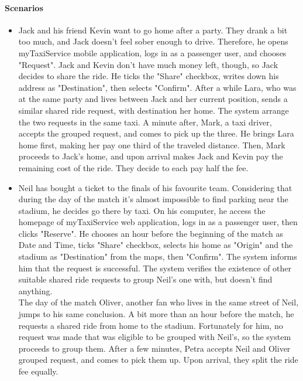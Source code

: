 	\paragraph{Scenarios}
		\begin{itemize}
			\item Jack and his friend Kevin want to go home after a party. They drank a bit too much, and Jack doesn't feel sober enough to drive. Therefore, he opens myTaxiService mobile application, logs in as a passenger user, and chooses "Request". Jack and Kevin don't have much money left, though, so Jack decides to share the ride. He ticks the "Share" checkbox, writes down his address as "Destination", then selects "Confirm". After a while Lara, who was at the same party and lives between Jack and her current position, sends a similar shared ride request, with destination her home. The system arrange the two requests in the same taxi. A minute after, Mark, a taxi driver, accepts the grouped request, and comes to pick up the three. He brings Lara home first, making her pay one third of the traveled distance. Then, Mark proceeds to Jack's home, and upon arrival makes Jack and Kevin pay the remaining cost of the ride. They decide to each pay half the fee.
			
			\item Neil has bought a ticket to the finals of his favourite team. Considering that during the day of the match it's almost impossible to find parking near the stadium, he decides go there by taxi. On his computer, he access the homepage of myTaxiService web application, logs in as a passenger user, then clicks "Reserve". He chooses an hour before the beginning of the match as Date and Time, ticks "Share" checkbox, selects his home as "Origin" and the stadium as "Destination" from the maps, then "Confirm". The system informs him that the request is successful. The system verifies the existence of other suitable shared ride requests to group Neil's one with, but doesn't find anything.\\
			The day of the match Oliver, another fan who lives in the same street of Neil, jumps to his same conclusion. A bit more than an hour before the match, he requests a shared ride from home to the stadium. Fortunately for him, no request was made that was eligible to be grouped with Neil's, so the system proceeds to group them. After a few minutes, Petra accepts Neil and Oliver grouped request, and comes to pick them up. Upon arrival, they split the ride fee equally.
		\end{itemize}
	
